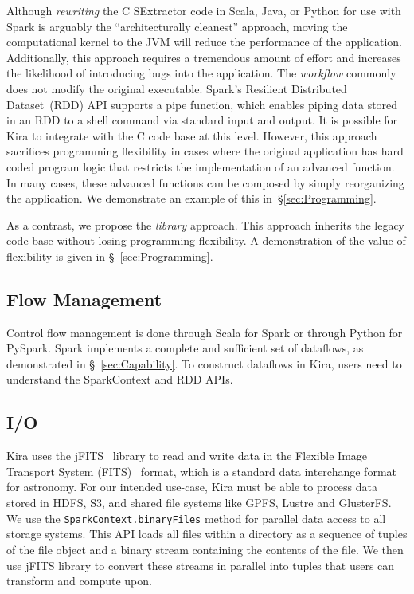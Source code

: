 \documentclass[10pt, conference, compsocconf]{IEEEtran}
\begin{document}
Although \emph{rewriting} the C SExtractor code in Scala, Java, or Python for use with Spark is arguably
the ``architecturally cleanest'' approach, moving the computational kernel to the JVM will
reduce the performance of the application. Additionally, this approach requires a tremendous
amount of effort and increases the likelihood of introducing bugs into the application. 
The \emph{workflow} commonly does not modify the original executable. Spark's
Resilient Distributed Dataset~(RDD) API supports a pipe function, which enables piping data
stored in an RDD to a shell command via standard input and output. It is possible for Kira to
integrate with the C code base at this level. However, this approach sacrifices programming
flexibility in cases where the original application has hard coded program logic that restricts
the implementation of an advanced function. In many cases, these advanced functions can be composed
by simply reorganizing the application. We demonstrate an example of this in~\S\ref{sec:Programming}.

As a contrast, we propose the \emph{library} approach. This approach inherits the legacy code
base without losing programming flexibility. A demonstration of the value of flexibility is
given in \S~\ref{sec:Programming}. 

\subsection{Flow Management}

Control flow management is done through Scala for Spark or through Python for PySpark.
Spark implements a complete and sufficient set of dataflows, as demonstrated in
\S~\ref{sec:Capability}. To construct dataflows in Kira, users need to understand
the SparkContext and RDD APIs.

\subsection{I/O}
\label{sec:Design-I/O}
Kira uses the jFITS~\cite{jfits} library to read and write data in the Flexible Image Transport System (FITS)~\cite{wells81} format,
which is a standard data interchange format for astronomy. For our intended use-case, Kira must be
able to process data stored in HDFS, S3, and shared file systems like GPFS, Lustre and GlusterFS.
We use the \texttt{SparkContext.binaryFiles} method for parallel data access to all storage systems.
This API loads all files within a directory as a sequence of tuples of the file object and a binary
stream containing the contents of the file. We then use jFITS library to convert these streams in
parallel into tuples that users can transform and compute upon. 
\end{document}
